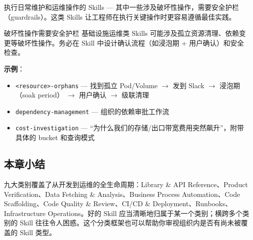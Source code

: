 执行日常维护和运维操作的 Skills --- 其中一些涉及破坏性操作，需要安全护栏（guardrails）。这类 Skills 让工程师在执行关键操作时更容易遵循最佳实践。

\begin{warningbox}{破坏性操作需要安全护栏}
基础设施运维类 Skills 可能涉及孤立资源清理、依赖变更等破坏性操作。务必在 Skill 中设计确认流程（如浸泡期 + 用户确认）和安全检查。
\end{warningbox}

\textbf{示例}：
\begin{itemize}
    \item \texttt{<resource>-orphans} --- 找到孤立 Pod/Volume $\to$ 发到 Slack $\to$ 浸泡期（soak period） $\to$ 用户确认 $\to$ 级联清理
    \item \texttt{dependency-management} --- 组织的依赖审批工作流
    \item \texttt{cost-investigation} --- ``为什么我们的存储/出口带宽费用突然飙升''，附带具体的 bucket 和查询模式
\end{itemize}

\subsection{本章小结}

九大类别覆盖了从开发到运维的全生命周期：Library \& API Reference、Product Verification、Data Fetching \& Analysis、Business Process Automation、Code Scaffolding、Code Quality \& Review、CI/CD \& Deployment、Runbooks、Infrastructure Operations。好的 Skill 应当清晰地归属于某一个类别；横跨多个类别的 Skill 往往令人困惑。这个分类框架也可以帮助你审视组织内是否有尚未被覆盖的 Skill 类型。

